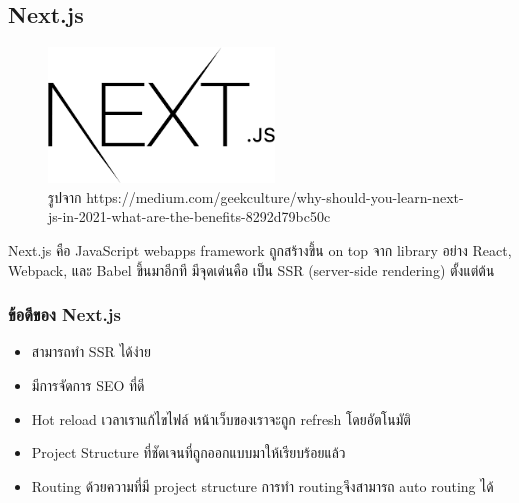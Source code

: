 \subsection{Next.js}
\begin{figure}[H] %
    \centering
    \includegraphics[width=60mm, keepaspectratio ]{pictures/nextjs.png}
    \caption[Poem]{รูปจาก https://medium.com/geekculture/why-should-you-learn-next-js-in-2021-what-are-the-benefits-8292d79bc50c}
    \label{fig:nextjs}
\end{figure}
\hspace{1.27cm}Next.js\cite{Nextjs} คือ JavaScript webapps framework ถูกสร้างขึ้น on top จาก library อย่าง React, Webpack, และ Babel ขึ้นมาอีกที มีจุดเด่นคือ เป็น SSR (server-side rendering) ตั้งแต่ต้น
\subsubsection{ข้อดีของ Next.js}
\begin{itemize}
  \item สามารถทำ SSR ได้ง่าย
  \item มีการจัดการ SEO ที่ดี
  \item Hot reload เวลาเราแก้ไขไฟล์ หน้าเว็บของเราจะถูก refresh โดยอัตโนมัติ 
  \item Project Structure ที่ชัดเจนที่ถูกออกแบบมาให้เรียบร้อยแล้ว
  \item Routing ด้วยความที่มี project structure การทำ routingจึงสามารถ auto routing ได้
\end{itemize}


